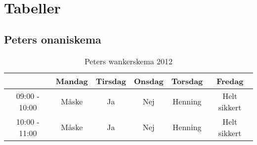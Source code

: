 \chapter{Tabeller}
\section{Peters onaniskema}
\begin{table}[htbp]
\centering
\begin{tabular}{|c|c|c|c|c|c|}
\hline
		 &  \textbf{Mandag}	&  \textbf{Tirsdag}	&  \textbf{Onsdag}	&  \textbf{Torsdag}	 &  \textbf{Fredag}	\\\hline
		09:00 - 10:00	& Måske	& Ja	& Nej & Henning	& Helt sikkert \\\hline
		10:00 - 11:00	& Måske	& Ja	& Nej & Henning	& Helt sikkert \\\hline
\end{tabular}
\caption{Peters wankerskema 2012}
\label{tab:wank}
\end{table}